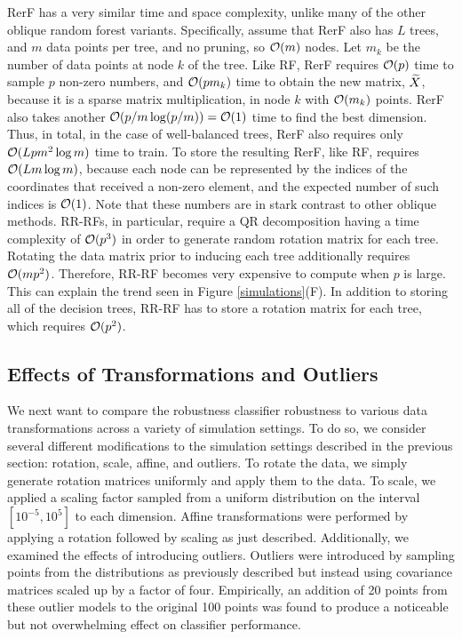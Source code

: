 RerF has a very similar time and space complexity, unlike many of the other oblique random forest variants.  Specifically, assume that RerF also has $L$ trees, and $m$ data points per tree, and no pruning, so $\mathcal{O}(m)$ nodes. Let $m_k$ be the number of data points at node $k$ of the tree. Like RF, RerF requires $\mathcal{O}(p)$ time to sample $p$ non-zero numbers, and $\mathcal{O}(pm_k)$ time to obtain the new matrix, $\widetilde{X}$, because it is a sparse matrix multiplication, in node $k$ with $\mathcal{O}(m_k)$ points. RerF also takes another $\mathcal{O}(p/m\log(p/m))=\mathcal{O}(1)$ time to find the best dimension. Thus, in total, in the case of well-balanced trees, RerF also requires only $\mathcal{O}(Lpm^2\log m)$ time to train.  To store the resulting RerF, like RF, requires $\mathcal{O}(L m\log m)$, because each node can be represented by the indices of the coordinates that received a non-zero element, and the expected number of such indices is $\mathcal{O}(1)$. Note that these numbers are in stark contrast to other oblique methods. RR-RFs, in particular, require a QR decomposition having a time complexity of $\mathcal{O}(p^3)$ in order to generate random rotation matrix for each tree. Rotating the data matrix prior to inducing each tree additionally requires $\mathcal{O}(mp^2)$. Therefore, RR-RF becomes very expensive to compute when $p$ is large. This can explain the trend seen in Figure \ref{simulations}(F). In addition to storing all of the decision trees, RR-RF has to store a rotation matrix for each tree, which requires $\mathcal{O}(p^2)$.

\subsection{Effects of Transformations and Outliers}
\label{section: trans}

We next want to compare the robustness classifier robustness to various data transformations across a variety of simulation settings. To do so, we consider several different modifications to the simulation settings described in the previous section: rotation, scale, affine, and outliers. To rotate the data, we simply generate rotation matrices uniformly and apply them to the data. To scale, we applied a scaling factor sampled from a uniform distribution on the interval $[10^{-5},10^5]$ to each dimension. Affine transformations were performed by applying a rotation followed by scaling as just described. Additionally, we examined the effects of introducing outliers. Outliers were introduced by sampling points from the distributions as previously described but instead using covariance matrices scaled up by a factor of four. Empirically, an addition of 20 points from these outlier models to the original 100 points was found to produce a noticeable but not overwhelming effect on classifier performance.

